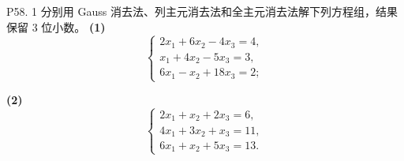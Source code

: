 \documentclass[11pt, a4paper]{ctexart}
\begin{document}
\begin{problem}{P58. 1 分别用 Gauss 消去法、列主元消去法和全主元消去法解下列方程组，结果保留 3 位小数。}
    \textbf{(1)}
    \[
        \begin{cases}
            2x_1 + 6x_2 - 4x_3 = 4, \\
            x_1 + 4x_2 - 5x_3 = 3, \\
            6x_1 - x_2 + 18x_3 = 2;
        \end{cases}
    \]

    \textbf{(2)}
    \[
        \begin{cases}
            2x_1 + x_2 + 2x_3 = 6, \\
            4x_1 + 3x_2 + x_3 = 11, \\
            6x_1 + x_2 + 5x_3 = 13.
        \end{cases}
    \]
\end{problem}
\end{document}
